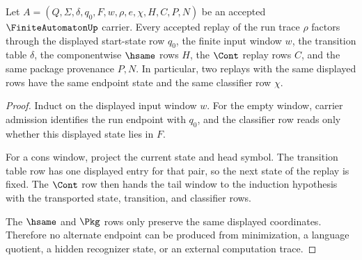 \begin{theorem}
\label{thm:finite-automaton-deterministic-replay-exactness}
Let $A=(Q,\Sigma,\delta,q_0,F,w,\rho,e,\chi,H,C,P,N)$ be an accepted
$\FiniteAutomatonUp$ carrier. Every accepted replay of the run trace $\rho$
factors through the displayed start-state row $q_0$, the finite input window
$w$, the transition table $\delta$, the componentwise $\hsame$ rows $H$, the
$\Cont$ replay rows $C$, and the same package provenance $P,N$. In particular,
two replays with the same displayed rows have the same endpoint state and the
same classifier row $\chi$.
\end{theorem}
\begin{proof}
Induct on the displayed input window $w$. For the empty window, carrier
admission identifies the run endpoint with $q_0$, and the classifier row reads
only whether this displayed state lies in $F$.

For a cons window, project the current state and head symbol. The transition
table row has one displayed entry for that pair, so the next state of the
replay is fixed. The $\Cont$ row then hands the tail window to the induction
hypothesis with the transported state, transition, and classifier rows.

The $\hsame$ and $\Pkg$ rows only preserve the same displayed coordinates.
Therefore no alternate endpoint can be produced from minimization, a language
quotient, a hidden recognizer state, or an external computation trace.
\end{proof}

